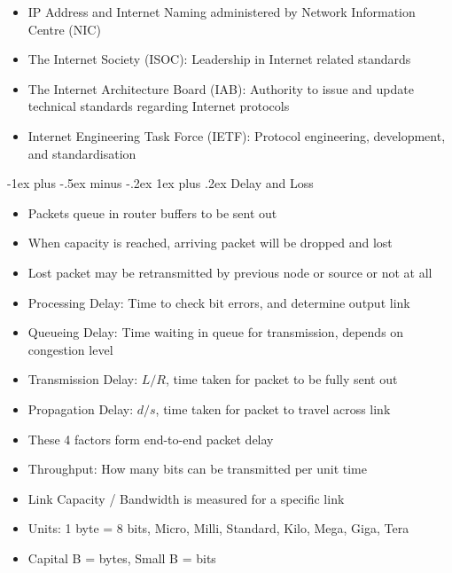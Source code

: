 \documentclass[10pt, landscape]{article}
\makeatletter
\renewcommand{\subsection}{\@startsection{subsection}{3}{0mm}%
                                {-1ex plus -.5ex minus -.2ex}%
                                {1ex plus .2ex}%
                                {\normalfont\small\bfseries}}%
\makeatother
\begin{document}
\begin{multicols*}{3}
\begin{itemize}
    \begin{itemize}
        \item IP Address and Internet Naming administered by Network Information Centre (NIC)
        \item The Internet Society (ISOC): Leadership in Internet related standards
        \item The Internet Architecture Board (IAB): Authority to issue and update technical standards regarding Internet protocols
        \item Internet Engineering Task Force (IETF): Protocol engineering, development, and standardisation
    \end{itemize}
\end{itemize}

\subsection{Delay and Loss}
\begin{itemize}
    \item Packets queue in router buffers to be sent out
    \item When capacity is reached, arriving packet will be dropped and lost
    \item Lost packet may be retransmitted by previous node or source or not at all
    \item Processing Delay: Time to check bit errors, and determine output link
    \item Queueing Delay: Time waiting in queue for transmission, depends on congestion level
    \item Transmission Delay: $L/R$, time taken for packet to be fully sent out
    \item Propagation Delay: $d/s$, time taken for packet to travel across link
    \item These 4 factors form end-to-end packet delay
    \item Throughput: How many bits can be transmitted per unit time
    \item Link Capacity / Bandwidth is measured for a specific link
    \item Units: 1 byte = 8 bits, Micro, Milli, Standard, Kilo, Mega, Giga, Tera
    \item Capital B = bytes, Small B = bits
\end{itemize}


\end{multicols*}
\end{document}
